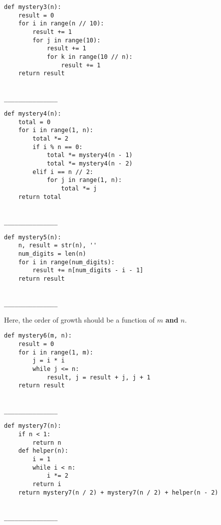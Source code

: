 \documentclass[twoside]{article}
\begin{document}
\begin{enumerate}
\begin{lstlisting}
def mystery3(n):
    result = 0
    for i in range(n // 10):
        result += 1
        for j in range(10):
            result += 1
            for k in range(10 // n):
                result += 1
    return result
\end{lstlisting}
~\\
\lstinline{_______________}


\begin{lstlisting}
def mystery4(n):
    total = 0
    for i in range(1, n):
        total *= 2
        if i % n == 0:
            total *= mystery4(n - 1)
            total *= mystery4(n - 2)
        elif i == n // 2:
            for j in range(1, n):
                total *= j
    return total
\end{lstlisting}
~\\
\lstinline{_______________}


\begin{lstlisting}
def mystery5(n):
    n, result = str(n), ''
    num_digits = len(n)
    for i in range(num_digits):
        result += n[num_digits - i - 1]
    return result
\end{lstlisting}
~\\
\lstinline{_______________}


Here, the order of growth should be a function of $m$ \textbf{and} $n$.

\begin{lstlisting}
def mystery6(m, n):
    result = 0
    for i in range(1, m):
        j = i * i
        while j <= n:
            result, j = result + j, j + 1
    return result
\end{lstlisting}
~\\
\lstinline{_______________}


\begin{lstlisting}
def mystery7(n):
    if n < 1:
        return n
    def helper(n):
        i = 1
        while i < n:
            i *= 2
        return i
    return mystery7(n / 2) + mystery7(n / 2) + helper(n - 2)
\end{lstlisting}
~\\
\lstinline{_______________}


\end{enumerate}
\end{document}
